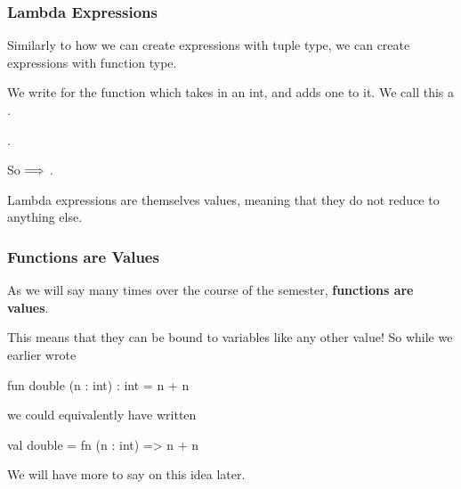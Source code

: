 \documentclass[aspectratio=169]{beamer}
\begin{document}
\begin{frame}[fragile]
  \frametitle{Lambda Expressions}

  Similarly to how we can create expressions with tuple type, we can create expressions
  with function type.

  \pause
  \vspace{\fill}

  We write  for the function which takes in an int, and adds one to it. 
  We call this a .

  \pause
  \vspace{5pt}

  .

  \pause
  \vspace{\fill}

  So  $\Longrightarrow$ .

  \pause
  \vspace{\fill}

  Lambda expressions are themselves values, meaning that they do not reduce to anything else.

  \pause
  \vspace{\fill}

\end{frame}

\begin{frame}[fragile]
  \frametitle{Functions are Values}

  As we will say many times over the course of the semester, \textbf{functions are values}.

  \pause
  \vspace{\fill}

  This means that they can be bound to variables like any other value! So while we earlier
  wrote 
  \begin{codeblock}
    fun double (n : int) : int = n + n
  \end{codeblock}

  \pause
  \vspace{\fill}

  we could equivalently have written
  \begin{codeblock}
    val double = fn (n : int) => n + n
  \end{codeblock}

  \vspace{\fill}

  We will have more to say on this idea later.
\end{frame}
\end{document}
